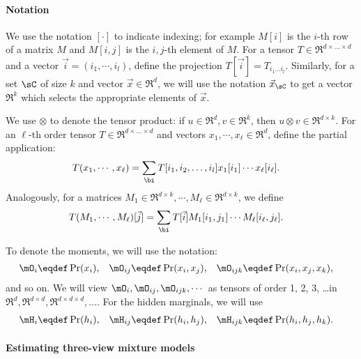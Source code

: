 \paragraph{Notation}

We use the notation $[\cdot]$ to indicate indexing; for example $M[i]$
  is the $i$-th row of a matrix $M$ and $M[i,j]$ is the $i,j$-th element
  of $M$.
For a tensor $T \in \Re^{d \times \ldots \times d}$ and a vector $\vec
  i = (i_1, \cdots, i_l)$, define the projection $T[\vec i] = T_{i_1 \ldots i_l}$.
Similarly, for a set $\sC$ of size $k$ and vector $\vec x \in \Re^d$, we
  will use the notation $\vec x_\sC$ to get a vector $\Re^k$ which selects
  the appropriate elements of $\vec x$.

We use $\otimes$ to denote the tensor product: if $u \in \Re^d,
  v \in \Re^k$, then $u \otimes v \in \Re^{d \times k}$.
For an $\ell$-th order tensor $T \in \Re^{d \times \ldots \times
  d}$ and vectors $x_1, \cdots, x_\ell \in \Re^{d}$, define 
  the partial application:
\begin{align*}
  T(x_1, \cdots, x_\ell) 
  &= \sum_{\bi}
            T[i_1, i_2, \ldots, i_l] x_1[i_1] \cdots x_\ell[i_\ell].
\end{align*}
Analogously, for a matrices $M_1 \in \Re^{d \times k}, \cdots,
  M_\ell \in \Re^{d \times k}$, we define
\begin{align*}
  T(M_1, \cdots, M_\ell)[\vec j]
  &= \sum_{\bi}
            T[\vec i] {M_1}[i_1,j_1] \cdots M_\ell[i_\ell, j_\ell].
\end{align*}

To denote the moments, we will use the notation:
\begin{align*}
  \mO_i &\eqdef \Pr(x_i), &
  \mO_{ij} &\eqdef \Pr(x_i, x_j), &
  \mO_{ijk} &\eqdef \Pr(x_i, x_j, x_k),
\end{align*}
and so on.
We will view $\mO_i, \mO_{ij}, \mO_{ijk}, \cdots$ as tensors of
  order 1, 2, 3, \ldots in $\Re^d, \Re^{d\times d}, \Re^{d \times
  d \times d},\ldots$.
For the hidden marginals, we will use 
\begin{align*}
  \mH_i &\eqdef \Pr(h_i), &
  \mH_{ij} &\eqdef \Pr(h_i, h_j), &
  \mH_{ijk} &\eqdef \Pr(h_i, h_j, h_k).
\end{align*}


\paragraph{Estimating three-view mixture models}

